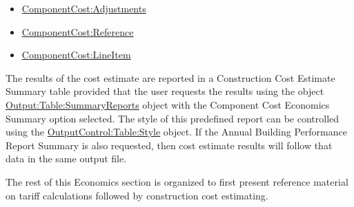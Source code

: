 \begin{itemize}
\item
  \hyperref[componentcostadjustments]{ComponentCost:Adjustments}
\item
  \hyperref[componentcostreference]{ComponentCost:Reference}
\item
  \hyperref[componentcostlineitem]{ComponentCost:LineItem}
\end{itemize}

The results of the cost estimate are reported in a Construction Cost Estimate Summary table provided that the user requests the results using the object \hyperref[outputtablesummaryreports]{Output:Table:SummaryReports} object with the Component Cost Economics Summary option selected. The style of this predefined report can be controlled using the \hyperref[outputcontroltablestyle]{OutputControl:Table:Style} object. If the Annual Building Performance Report Summary is also requested, then cost estimate results will follow that data in the same output file.

The rest of this Economics section is organized to first present reference material on tariff calculations followed by construction cost estimating.